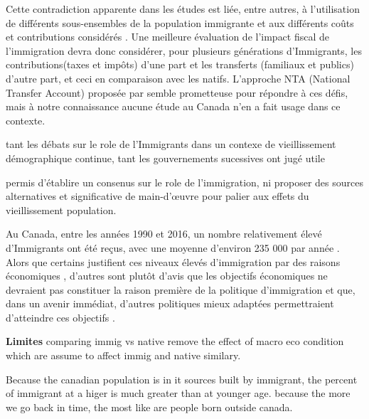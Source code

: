 Cette contradiction apparente dans les études est liée, entre autres, à l'utilisation de différents sous-ensembles de la population immigrante \citep{Grubel:2012wo} et aux différents coûts et contributions considérés \citep{dAlbis:2019de}. Une meilleure évaluation de l'impact fiscal de l'immigration devra donc considérer, pour plusieurs générations d'Immigrants, les contributions(taxes et impôts) d'une part et les transferts (familiaux et publics) d'autre part, et ceci en comparaison avec les natifs. L'approche NTA (National Transfer Account) proposée par \citet{Mason:2011wc} semble prometteuse pour répondre à ces défis, mais à notre connaissance aucune étude au Canada n'en a fait usage dans ce contexte.

tant les débats sur le role de l'Immigrants dans un contexe de vieillissement démographique continue, tant les gouvernements sucessives ont jugé utile




permis d'établire un consenus sur le role de l'immigration, ni proposer des sources alternatives et significative de main-d’œuvre pour palier aux effets du vieillissement population.



 Au Canada, entre  les années 1990 et 2016, un nombre relativement élevé d’Immigrants ont été reçus, avec une moyenne d’environ 235 000 par année \citep{StatistiqueCanada:2016ud}. Alors que certains justifient ces niveaux élevés d’immigration par des raisons économiques \citep{Christine:2015tu,Newton:1981jy}, d’autres sont plutôt d’avis que les objectifs économiques ne devraient pas constituer la raison première de la politique d’immigration et que, dans un avenir immédiat, d’autres politiques mieux adaptées permettraient d’atteindre ces objectifs \citep{Gingras:2000dk,Green:1999ko,McDaniel:2013kf,Wong:2015uz}.



\textbf{Limites}
comparing immig vs native remove the effect of macro eco condition which are assume to affect immig and native similary.


Because the canadian population is in it sources built by immigrant, the percent of immigrant at a higer is much greater than at younger age. because the more we go back in time, the most like are people born outside canada.




